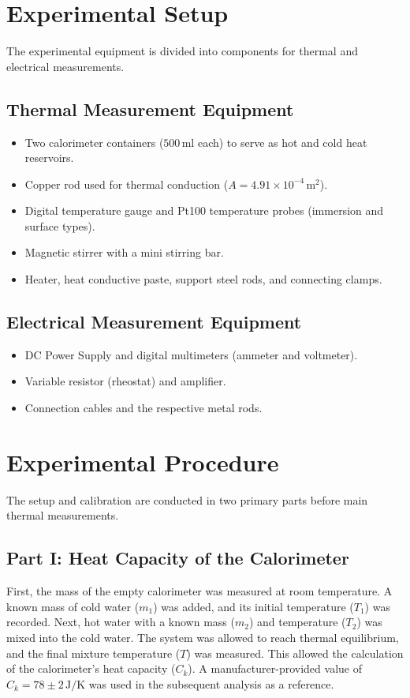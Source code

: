 \documentclass[journal]{IEEEtran}
\begin{document}
\section{Experimental Setup}
The experimental equipment is divided into components for thermal and electrical measurements.

\subsection{Thermal Measurement Equipment}
\begin{itemize}
    \item Two calorimeter containers ($500\,\text{ml}$ each) to serve as hot and cold heat reservoirs.
    \item Copper rod used for thermal conduction ($A = 4.91 \times 10^{-4}\,\text{m}^2$).
    \item Digital temperature gauge and Pt100 temperature probes (immersion and surface types).
    \item Magnetic stirrer with a mini stirring bar.
    \item Heater, heat conductive paste, support steel rods, and connecting clamps.
\end{itemize}

\subsection{Electrical Measurement Equipment}
\begin{itemize}
    \item DC Power Supply and digital multimeters (ammeter and voltmeter).
    \item Variable resistor (rheostat) and amplifier.
    \item Connection cables and the respective metal rods.
\end{itemize}

\section{Experimental Procedure}
The setup and calibration are conducted in two primary parts before main thermal measurements.

\subsection{Part I: Heat Capacity of the Calorimeter}
First, the mass of the empty calorimeter was measured at room temperature. A known mass of cold water ($m_1$) was added, and its initial temperature ($T_1$) was recorded. Next, hot water with a known mass ($m_2$) and temperature ($T_2$) was mixed into the cold water. The system was allowed to reach thermal equilibrium, and the final mixture temperature ($T$) was measured. This allowed the calculation of the calorimeter's heat capacity ($C_k$). A manufacturer-provided value of $C_k = 78 \pm 2\,\text{J/K}$ was used in the subsequent analysis as a reference.
\end{document}
